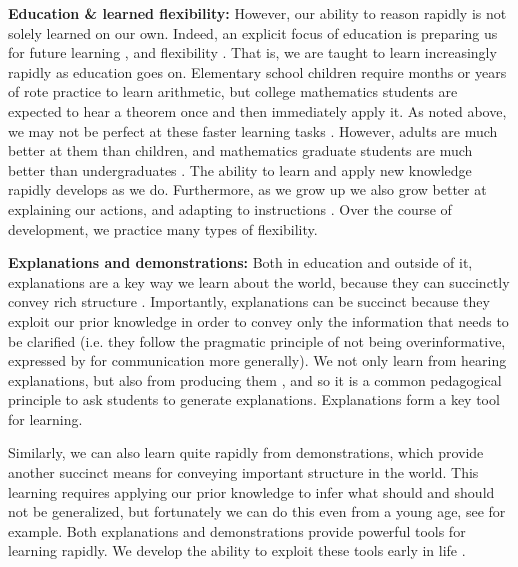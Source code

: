 \textbf{Education \& learned flexibility:} However, our ability to reason rapidly is not solely learned on our own. Indeed, an explicit focus of education is preparing us for future learning \citep{Bransford1999}, and flexibility \citep[e.g.][]{Richland2012}. That is, we are taught to learn increasingly rapidly as education goes on. Elementary school children require months or years of rote practice to learn arithmetic, but college mathematics students are expected to hear a theorem once and then immediately apply it. As noted above, we may not be perfect at these faster learning tasks \citep[e.g.][]{Hazzan1999}. However, adults are much better at them than children, and mathematics graduate students are much better than undergraduates \citep{Weber2001}. The ability to learn and apply new knowledge rapidly develops as we do. Furthermore, as we grow up we also grow better at explaining our actions, and adapting to instructions \citep[e.g.][]{Doebel2015}. Over the course of development, we practice many types of flexibility. \par 
\textbf{Explanations and demonstrations:} Both in education and outside of it, explanations are a key way we learn about the world, because they can succinctly convey rich structure \citep[e.g.][]{Keil2006, Lombrozo2006}. Importantly, explanations can be succinct because they exploit our prior knowledge in order to convey only the information that needs to be clarified (i.e. they follow the pragmatic principle of not being overinformative, expressed by \citet{Grice1975} for communication more generally). We not only learn from hearing explanations, but also from producing them \citep{Chi1989, Chi1994}, and so it is a common pedagogical principle to ask students to generate explanations. Explanations form a key tool for learning. \par
Similarly, we can also learn quite rapidly from demonstrations, which provide another succinct means for conveying important structure in the world. This learning requires applying our prior knowledge to infer what should and should not be generalized, but fortunately we can do this even from a young age, see \citet{VanDamme2002} for example. Both explanations and demonstrations provide powerful tools for learning rapidly. We develop the ability to exploit these tools early in life \citep{Carpenter2005}. \par 
